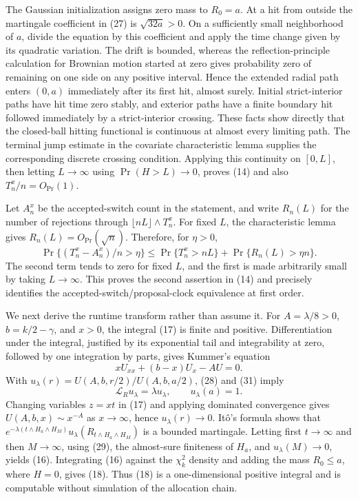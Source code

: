 The Gaussian initialization assigns zero mass to \(R_0=a\).  At a hit from outside the martingale coefficient in (27) is \(\sqrt{32a}>0\).  On a sufficiently small neighborhood of \(a\), divide the equation by this coefficient and apply the time change given by its quadratic variation.  The drift is bounded, whereas the reflection-principle calculation for Brownian motion started at zero gives probability zero of remaining on one side on any positive interval.  Hence the extended radial path enters \((0,a)\) immediately after its first hit, almost surely.  Initial strict-interior paths have hit time zero stably, and exterior paths have a finite boundary hit followed immediately by a strict-interior crossing.  These facts show directly that the closed-ball hitting functional is continuous at almost every limiting path.  The terminal jump estimate in the covariate characteristic lemma supplies the corresponding discrete crossing condition.  Applying this continuity on \([0,L]\), then letting \(L\to\infty\) using \(\Pr(H>L)\to0\), proves (14) and also \(T_n^x/n=O_{\Pr}(1)\).

Let \(A_n^x\) be the accepted-switch count in the statement, and write \(R_n(L)\) for the number of rejections through \(\lfloor nL\rfloor\wedge T_n^x\).  For fixed \(L\), the characteristic lemma gives \(R_n(L)=O_{\Pr}(\sqrt n)\).  Therefore, for \(\eta>0\),
\[
 \Pr\{(T_n^x-A_n^x)/n>\eta\}
 \le \Pr\{T_n^x>nL\}+\Pr\{R_n(L)>\eta n\}. \tag{30}
\]
The second term tends to zero for fixed \(L\), and the first is made arbitrarily small by taking \(L\to\infty\).  This proves the second assertion in (14) and precisely identifies the accepted-switch/proposal-clock equivalence at first order.

We next derive the runtime transform rather than assume it.  For \(A=\lambda/8>0\), \(b=k/2-\gamma\), and \(x>0\), the integral (17) is finite and positive.  Differentiation under the integral, justified by its exponential tail and integrability at zero, followed by one integration by parts, gives Kummer's equation
\[
 xU_{xx}+(b-x)U_x-AU=0. \tag{31}
\]
With \(u_\lambda(r)=U(A,b,r/2)/U(A,b,a/2)\), (28) and (31) imply
\[
 \mathcal L_Ru_\lambda=\lambda u_\lambda,
 \qquad u_\lambda(a)=1. \tag{32}
\]
Changing variables \(z=xt\) in (17) and applying dominated convergence gives \(U(A,b,x)\sim x^{-A}\) as \(x\to\infty\), hence \(u_\lambda(r)\to0\).  It\^o's formula shows that \(e^{-\lambda(t\wedge H_a\wedge H_M)}u_\lambda(R_{t\wedge H_a\wedge H_M})\) is a bounded martingale.  Letting first \(t\to\infty\) and then \(M\to\infty\), using (29), the almost-sure finiteness of \(H_a\), and \(u_\lambda(M)\to0\), yields (16).  Integrating (16) against the \(\chi_k^2\) density and adding the mass \(R_0\le a\), where \(H=0\), gives (18).  Thus (18) is a one-dimensional positive integral and is computable without simulation of the allocation chain.

